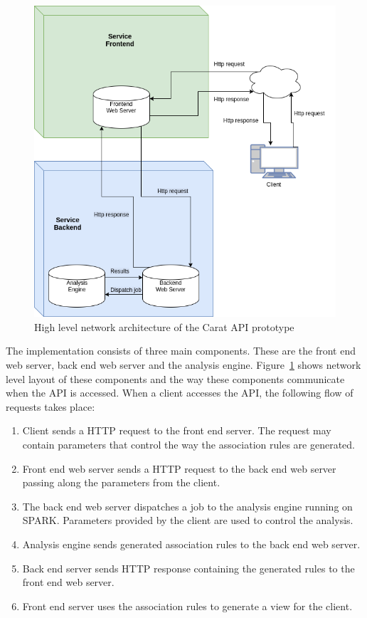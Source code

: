 \begin{figure}[!htbp]
	\centering
	\includegraphics[width=\textwidth]{images/carat-prototype-architecture.png}
	\caption{High level network architecture of the Carat API prototype}
	\label{figure:carat-api-network-prototype}
\end{figure}         

The implementation consists of three main components. These are the front end web server, back end web server and the analysis engine. Figure~\ref{figure:carat-api-network-prototype} shows network level layout of these components and the way these components communicate when the API is accessed. When a client accesses the API, the following flow of requests takes place:
\begin{enumerate}
	\item Client sends a HTTP request to the front end server. The request may contain parameters that control the way the association rules are generated.
	\item Front end web server sends a HTTP request to the back end web server passing along the parameters from the client.
	\item The back end web server dispatches a job to the analysis engine running on SPARK. Parameters provided by the client are used to control the analysis.
	\item Analysis engine sends generated association rules to the back end web server.
	\item Back end server sends HTTP response containing the generated rules to the front end web server.
	\item Front end server uses the association rules to generate a view for the client.  
\end{enumerate}    

